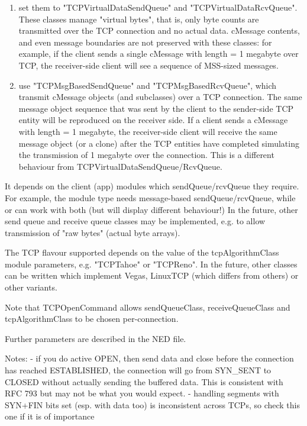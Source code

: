 \begin{enumerate}
  \item set them to "TCPVirtualDataSendQueue" and "TCPVirtualDataRcvQueue".
     These classes manage "virtual bytes", that is, only byte counts are
     transmitted over the TCP connection and no actual data. cMessage
     contents, and even message boundaries are not preserved with these
     classes: for example, if the client sends a single cMessage with
     length = 1 megabyte over TCP, the receiver-side client will see a
     sequence of MSS-sized messages.

  \item use "TCPMsgBasedSendQueue" and "TCPMsgBasedRcvQueue", which transmit
     cMessage objects (and subclasses) over a TCP connection. The same
     message object sequence that was sent by the client to the
     sender-side TCP entity will be reproduced on the receiver side.
     If a client sends a cMessage with length = 1 megabyte, the
     receiver-side client will receive the same message object (or a clone)
     after the TCP entities have completed simulating the transmission
     of 1 megabyte over the connection. This is a different behaviour
     from TCPVirtualDataSendQueue/RcvQueue.
\end{enumerate}

It depends on the client (app) modules which sendQueue/rcvQueue they require.
For example, the  module type needs message-based
sendQueue/rcvQueue, while  or  can work
with both (but  will display different behaviour!)
In the future, other send queue and receive queue classes may be implemented,
e.g. to allow transmission of "raw bytes" (actual byte arrays).

The TCP flavour supported depends on the value of the tcpAlgorithmClass
module parameters, e.g. "TCPTahoe" or "TCPReno". In the future, other
classes can be written which implement Vegas, LinuxTCP (which
differs from others) or other variants.

Note that TCPOpenCommand allows sendQueueClass, receiveQueueClass and
tcpAlgorithmClass to be chosen per-connection.

Further parameters are described in the NED file.

Notes:
 - if you do active OPEN, then send data and close before the connection
   has reached ESTABLISHED, the connection will go from SYN\_SENT to CLOSED
   without actually sending the buffered data. This is consistent with
   RFC 793 but may not be what you would expect.
 - handling segments with SYN+FIN bits set (esp. with data too) is
   inconsistent across TCPs, so check this one if it is of importance




